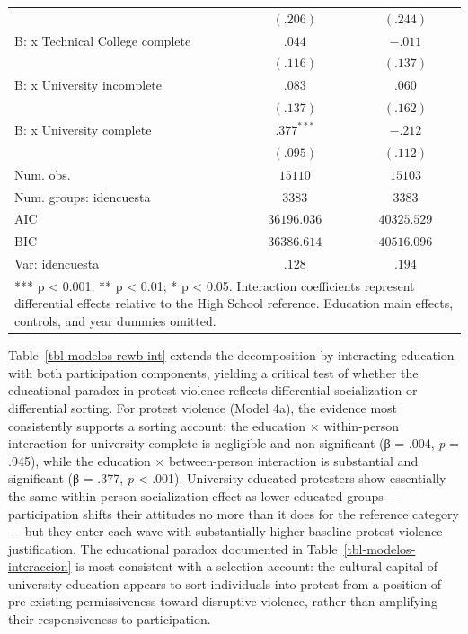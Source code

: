 \documentclass[
  13pt,
]{article}
\begin{document}
\begin{table}
{{\begin{tabular}{l c c}
                                                  & $(.206)$     & $(.244)$      \\
\quad B: x Technical College complete             & $.044$       & $-.011$       \\
                                                  & $(.116)$     & $(.137)$      \\
\quad B: x University incomplete                  & $.083$       & $.060$        \\
                                                  & $(.137)$     & $(.162)$      \\
\quad B: x University complete                    & $.377^{***}$ & $-.212$       \\
                                                  & $(.095)$     & $(.112)$      \\
\midrule
Num. obs.                                         & $15110$      & $15103$       \\
Num. groups: idencuesta                           & $3383$       & $3383$        \\
AIC                                               & $36196.036$  & $40325.529$   \\
BIC                                               & $36386.614$  & $40516.096$   \\
Var: idencuesta                                   & $.128$       & $.194$        \\
\bottomrule
\multicolumn{3}{l}{\scriptsize{*** p < 0.001; ** p < 0.01; * p < 0.05. Interaction coefficients represent differential effects relative to the High School reference. Education main effects, controls, and year dummies omitted.}}
\end{tabular}
}

}

\end{table}%

Table~\ref{tbl-modelos-rewb-int} extends the decomposition by
interacting education with both participation components, yielding a
critical test of whether the educational paradox in protest violence
reflects differential socialization or differential sorting. For protest
violence (Model 4a), the evidence most consistently supports a sorting
account: the education × within-person interaction for university
complete is negligible and non-significant (β = .004, \emph{p} = .945),
while the education × between-person interaction is substantial and
significant (β = .377, \emph{p} \textless{} .001). University-educated
protesters show essentially the same within-person socialization effect
as lower-educated groups --- participation shifts their attitudes no
more than it does for the reference category --- but they enter each
wave with substantially higher baseline protest violence justification.
The educational paradox documented in
Table~\ref{tbl-modelos-interaccion} is most consistent with a selection
account: the cultural capital of university education appears to sort
individuals into protest from a position of pre-existing permissiveness
toward disruptive violence, rather than amplifying their responsiveness
to participation.
\end{document}
